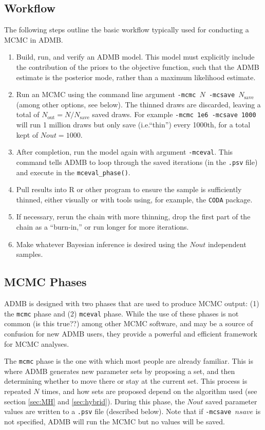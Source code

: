 \documentclass{article}\usepackage[]{graphicx}\usepackage[]{color}
\begin{document}
\subsection{Workflow}
The following steps outline the basic workflow typically
used for conducting a MCMC in ADMB.
\begin{enumerate}
\item Build, run, and verify an ADMB model. This model must
  explicitly include the contribution of the priors to the
  objective function, such that the ADMB estimate is the
  posterior mode, rather than a maximum likelihood estimate.
\item Run an MCMC using the command line argument
  \texttt{-mcmc $N$ -mcsave $N_{\text{save}}$} (among other
  options, see below). The thinned draws are discarded,
  leaving a total of $N_{\text{out}}=N/N_{\text{save}}$
  saved draws. For example \texttt{-mcmc 1e6 -mcsave 1000}
  will run 1 million draws but only save (i.e.``thin'')
  every 1000th, for a total kept of $Nout=1000$.
\item After completion, run the model again with argument
  \texttt{-mceval}. This command tells ADMB to loop through
  the saved iterations (in the \texttt{.psv} file) and
  execute in the \texttt{mceval\_phase()}.
\item Pull results into R or other program to ensure the
  sample is sufficiently thinned, either visually or with
  tools using, for example, the \texttt{CODA} package.
\item If necessary, rerun the chain with more thinning, drop
  the first part of the chain as a ``burn-in,'' or run
  longer for more iterations.
\item Make whatever Bayesian inference is desired using the
  $Nout$ independent samples.
\end{enumerate}

\subsection{MCMC Phases}
ADMB is designed with two phases that are used to produce
MCMC output: (1) the \texttt{mcmc} phase and (2)
\texttt{mceval} phase. While the use of these phases is not
common (is this true??) among other MCMC software, and may
be a source of confusion for new ADMB users, they provide a
powerful and efficient framework for MCMC analyses.

The \texttt{mcmc} phase is the one with which most people
are already familiar. This is where ADMB generates new
parameter sets by proposing a set, and then determining
whether to move there or stay at the current set. This
process is repeated $N$ times, and how sets are proposed
depend on the algorithm used (see section \ref{sec:MH} and
\ref{sec:hybrid}). During this phase, the $Nout$ saved
parameter values are written to a \texttt{.psv} file
(described below). Note that if \texttt{-mcsave $nsave$} is
not specified, ADMB will run the MCMC but no values will be
saved.
\end{document}
